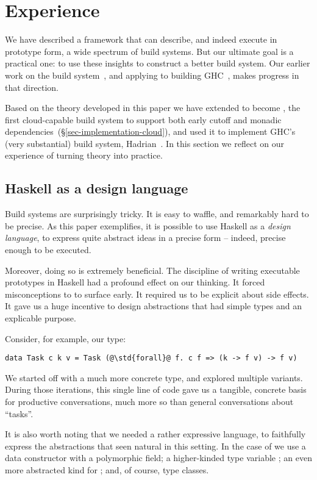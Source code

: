 \section{Experience}\label{sec-experience}

We have described a framework that can describe, and indeed execute in
prototype form, a wide spectrum of build systems.  But our ultimate
goal is a practical one: to use these insights to construct a better
build system.  Our earlier work on the \Shake build
system~\cite{mitchell2012shake}, and applying \Shake to
building GHC~\cite{hadrian}, makes progress in that direction.

Based on the theory developed in this paper we have extended \Shake to
become \Cloud \Shake, the first cloud-capable build system to support
both early cutoff and monadic dependencies~(\S\ref{sec-implementation-cloud}),
and used it to implement GHC's (very substantial) build system, Hadrian~\cite{hadrian}.
In this section we reflect on our experience of turning theory into practice.

\subsection{Haskell as a design language}\label{sec-design-lang}

Build systems are surprisingly tricky.  It is easy to waffle, and
remarkably hard to be precise. As this paper exemplifies, it is
possible to use Haskell as a \emph{design language}, to express quite
abstract ideas in a precise form -- indeed, precise enough to be executed.

Moreover, doing so is extremely beneficial.
The discipline of writing executable prototypes in
Haskell had a profound effect on our thinking. It forced misconceptions
to to surface early.  It required us to be explicit about side effects.
It gave us a huge incentive to design abstractions that had simple types
and an explicable purpose.

Consider, for example, our  type:
\begin{verbatim}
data Task c k v = Task (@\std{forall}@ f. c f => (k -> f v) -> f v)
\end{verbatim}
We started off with a much more concrete type, and explored
multiple variants.  During those iterations, this single line of
code gave us a tangible, concrete basis for productive conversations,
much more so than general conversations about ``tasks''.

It is also worth noting that we needed a rather expressive language,
to faithfully express the abstractions that seen natural in this
setting.  In the case of  we use a data constructor with a
polymorphic field; a higher-kinded type variable ; an
even more abstracted kind for ; and,
of course, type classes.

